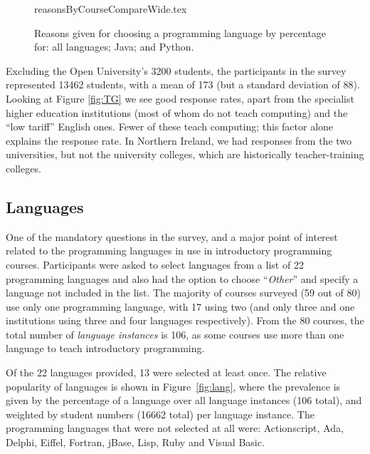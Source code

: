\documentclass[a4paper,11pt]{article}
\begin{document}
\begin{figure}
\begin{center}
{reasonsByCourseCompareWide.tex}
\end{center}
\caption{Reasons given for choosing a programming language by percentage for: all languages; Java; and Python.\label{fig:reasons}}
\end{figure}

Excluding the Open University's 3200 students, the participants in the
survey represented 13462 students, with a mean of 173 (but a standard
deviation of 88). Looking at Figure \ref{fig:TG} we see good response
rates, apart from the specialist higher education institutions (most
of whom do not teach computing) and the ``low tariff'' English
ones. Fewer of these teach computing; this factor alone explains the
response rate. In Northern Ireland, we had responses from the two
universities, but not the university colleges, which are historically
teacher-training colleges.

\subsection{Languages}\label{langs}


One of the mandatory questions in the survey, and a major point of
interest related to the programming languages in use in introductory
programming courses. Participants were asked to select languages from
a list of 22 programming languages and also had the option to choose
``{\emph{Other}}'' and specify a language not included in the list. The
majority of courses surveyed (59 out of 80) use only one programming
language, with 17 using two (and only three and one institutions using
three and four languages respectively). From the 80 courses, the total
number of {\emph{language instances}} is 106, as some courses use more
than one language to teach introductory programming.

Of the 22 languages provided, 13 were selected at least once. The
relative popularity of languages is shown in Figure~\ref{fig:lang},
where the prevalence is given by the percentage of a language over all
language instances (106 total), and weighted by student numbers (16662
total) per language instance. The programming languages that were not
selected at all were: Actionscript, Ada, Delphi, Eiffel, Fortran,
jBase, Lisp, Ruby and Visual Basic.
\end{document}
